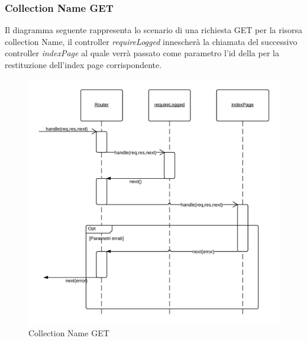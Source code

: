 \subsubsection{Collection Name GET} 
Il diagramma seguente rappresenta lo scenario di una richiesta GET per la risorsa collection Name, il controller \emph{requireLogged} innescherà la chiamata del successivo controller \emph{indexPage} al quale verrà passato come parametro l'id della  per la restituzione dell'index page corrispondente.
\begin{figure}[H]
	\begin{center} 
		\includegraphics[scale=0.20]{scenari/Collection Name GET.png} 
		\caption{Collection Name GET}
	\end{center} 
\end{figure}

